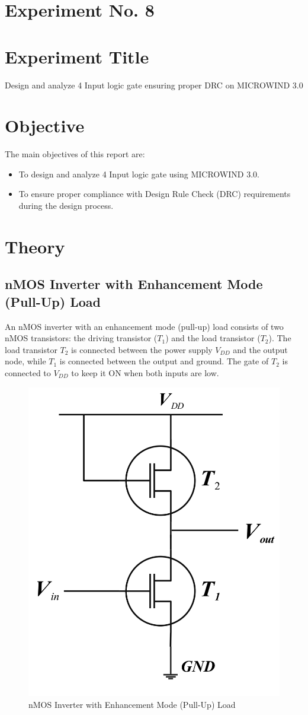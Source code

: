 \documentclass[a4paper,12pt]{article}
\begin{document}
	\section{Experiment No. 8}
	
	
	\section{Experiment Title }
	Design and analyze 4 Input logic gate ensuring proper DRC on MICROWIND 3.0
	\section{Objective}
	The main objectives of this report are:
	\begin{itemize}
		\item To design and analyze 4 Input logic gate using MICROWIND 3.0.
		\item To ensure proper compliance with Design Rule Check (DRC) requirements during the design process.
		
	\end{itemize}
	\section{Theory}
	\subsection{nMOS Inverter with Enhancement Mode (Pull-Up) Load}
	
	
	An nMOS inverter with an enhancement mode (pull-up) load consists of two nMOS transistors: the driving transistor (\(T_1\)) and the load transistor (\(T_2\)). The load transistor \(T_2\) is connected between the power supply \(V_{DD}\) and the output node, while \(T_1\) is connected between the output and ground. The gate of \(T_2\) is connected to \(V_{DD}\) to keep it ON when both inputs are low.\\
	\begin{figure}[H]
		\centering
		\includegraphics[width=0.45\linewidth]{../EXP04_EEE2214/Images/mos/1}
		\caption{nMOS Inverter with Enhancement Mode (Pull-Up) Load}
		\label{fig:1}
	\end{figure}
	
\end{document}
